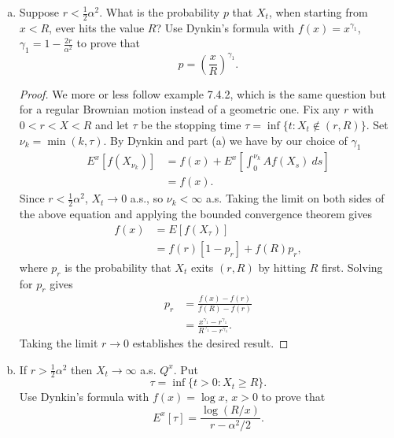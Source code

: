 \documentclass[11pt,letterpaper]{report}
\theoremstyle{definition}
\begin{document}
\begin{enumerate}[(a)]
	\item Suppose $r<\frac{1}{2}\alpha^2$. What is the probability $p$ that $X_t$, when starting from $x<R$, ever hits the value $R$? Use Dynkin's formula with $f(x) = x^{\gamma_1}$, $\gamma_1 = 1-\frac{2r}{\alpha^2}$ to prove that
	\[
	p = \left(\frac{x}{R}\right)^{\gamma_1}.
	\]
	\begin{proof}
		We more or less follow example 7.4.2, which is the same question but for a regular Brownian motion instead of a geometric one. Fix any $r$ with $0<r<X<R$ and let $\tau$ be the stopping time $\tau = \inf\{t: X_t\notin (r, R)\}$. Set $\nu_k = \min(k , \tau)$. By Dynkin and part (a) we have by our choice of $\gamma_1$
		\begin{align*}
			E^x[f(X_{\nu_k})] &= f(x) + E^x\left[\int_0^{\nu_k}Af(X_s)\ ds\right]\\
			&= f(x).
		\end{align*}
		Since $r<\frac{1}{2}\alpha^2$, $X_t\to 0$ a.s., so $\nu_k< \infty$ a.s. Taking the limit on both sides of the above equation and applying the bounded convergence theorem gives
		\begin{align*}
			f(x) &= E[f(X_\tau)]\\
			&= f(r)[1-p_r] + f(R)p_r,
		\end{align*}
		where $p_r$ is the probability that $X_t$ exits $(r, R)$ by hitting $R$ first. Solving for $p_r$ gives
		\begin{align*}
			p_r &= \frac{f(x)-f(r)}{f(R)-f(r)}\\
			&= \frac{x^{\gamma_1}-r^{\gamma_1}}{R^{\gamma_1} - r^{\gamma_1}}.
		\end{align*}
		Taking the limit $r\to 0$ establishes the desired result.
	\end{proof}


	\item If $r>\frac{1}{2}\alpha^2$ then $X_t\to \infty$ a.s. $Q^x$. Put
	\[
	\tau = \inf\{t>0: X_t\geq R\}.
	\]
	Use Dynkin's formula with $f(x)  = \log x$, $x>0$ to prove that
	\[
	E^x[\tau] = \frac{\log(R/x)}{r - \alpha^2/2}.
	\]
\end{enumerate}
\end{document}
